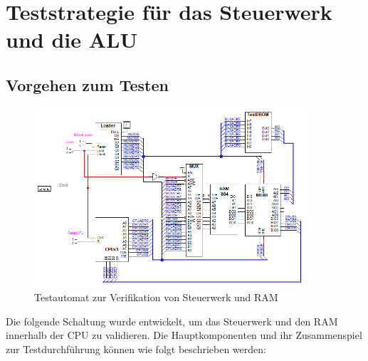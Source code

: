 \chapter{Teststrategie für das Steuerwerk und die ALU}
\label{chap:Testen}


\section{Vorgehen zum Testen}

\begin{figure}[H]
    \centering
    \includegraphics[width=0.9\textwidth]{content/figures/Testautomat.png}
    \caption{Testautomat zur Verifikation von Steuerwerk und RAM}
    \label{fig:Testautomat}
\end{figure}

Die folgende Schaltung wurde entwickelt, um das Steuerwerk und den RAM innerhalb der CPU zu validieren. Die Hauptkomponenten und ihr Zusammenspiel zur Testdurchführung können wie folgt beschrieben werden:

